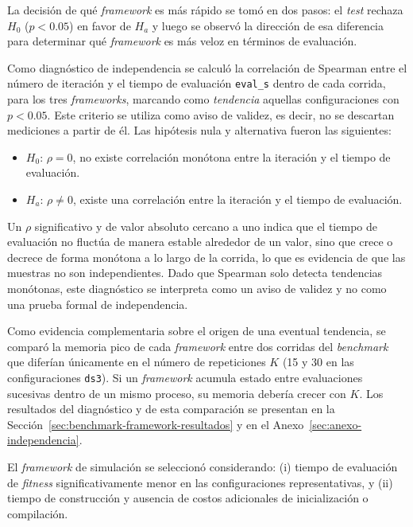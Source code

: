 La decisión de qué \textit{framework} es más rápido se tomó en dos pasos: el \textit{test} rechaza $H_0$ ($p<0.05$) en favor de $H_a$ y luego se observó la dirección de esa diferencia para determinar qué \textit{framework} es más veloz en términos de evaluación.

Como diagnóstico de independencia se calculó la correlación de Spearman entre el número de iteración y el tiempo de evaluación \texttt{eval\_s} dentro de cada corrida, para los tres \textit{frameworks}, marcando como \textit{tendencia} aquellas configuraciones con \(p < 0.05\). Este criterio se utiliza como aviso de validez, es decir, no se descartan mediciones a partir de él. Las hipótesis nula y alternativa fueron las siguientes: 

\begin{itemize}
    \item $H_0$: $\rho = 0$, no existe correlación monótona entre la iteración y el tiempo de evaluación.
    \item $H_a$: $\rho \neq 0$, existe una correlación entre la iteración y el tiempo de evaluación.
\end{itemize}

Un $\rho$ significativo y de valor absoluto cercano a uno indica que el tiempo de evaluación no fluctúa de manera estable alrededor de un valor, sino que crece o decrece de forma monótona a lo largo de la corrida, lo que es evidencia de que las muestras no son independientes. Dado que Spearman solo detecta tendencias monótonas, este diagnóstico se interpreta como un aviso de validez y no como una prueba formal de independencia.

Como evidencia complementaria sobre el origen de una eventual tendencia, se comparó la memoria pico de cada \textit{framework} entre dos corridas del \textit{benchmark} que diferían únicamente en el número de repeticiones $K$ (15 y 30 en las configuraciones \texttt{ds3}). Si un \textit{framework} acumula estado entre evaluaciones sucesivas dentro de un mismo proceso, su memoria debería crecer con $K$. Los resultados del diagnóstico y de esta comparación se presentan en la Sección~\ref{sec:benchmark-framework-resultados} y en el Anexo~\ref{sec:anexo-independencia}.


El \textit{framework} de simulación se seleccionó considerando: (i) tiempo de evaluación de \textit{fitness} significativamente menor en las configuraciones representativas, y (ii) tiempo de construcción y ausencia de costos adicionales de inicialización o compilación.


